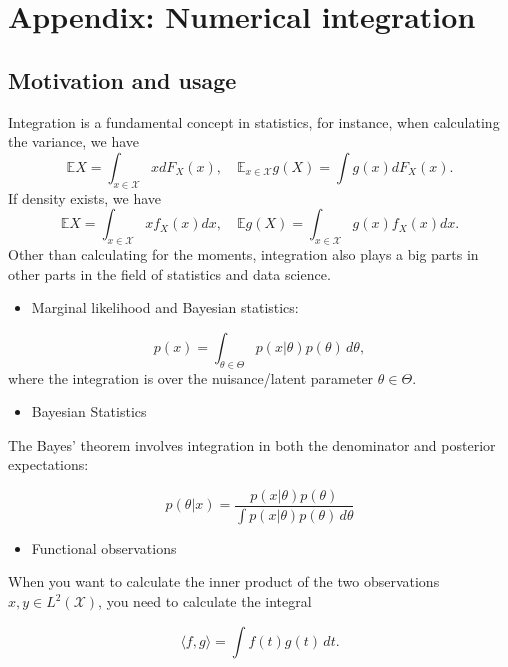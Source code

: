 \documentclass[
  letterpaper,
  DIV=11,
  numbers=noendperiod]{scrreprt}
\providecommand{\tightlist}{%
  \setlength{\itemsep}{0pt}\setlength{\parskip}{0pt}}
\begin{document}
\chapter{Appendix: Numerical
integration}\label{appendix-numerical-integration}

\newcommand{\E}{\mathbb E}
\newcommand{\X}{\mathcal X}

\section{Motivation and usage}\label{motivation-and-usage}

Integration is a fundamental concept in statistics, for instance, when
calculating the variance, we have \[
  \mathbb EX = \int_{x\in\mathcal X} x dF_X(x),\quad \mathbb E_{x\in\mathcal X} g(X) = \int g(x) dF_X(x).
\] If density exists, we have \[
\mathbb EX = \int_{x\in\mathcal X} x f_X(x) dx,\quad \mathbb Eg(X) = \int_{x\in\mathcal X} g(x) f_X(x) dx.
\] Other than calculating for the moments, integration also plays a big
parts in other parts in the field of statistics and data science.

\begin{itemize}
\tightlist
\item
  Marginal likelihood and Bayesian statistics:
\end{itemize}

\[
  p(x) = \int_{\theta\in\Theta}     p(x|\theta)p(\theta)\,d\theta,
\] where the integration is over the nuisance/latent parameter
\(\theta\in\Theta\).

\begin{itemize}
\tightlist
\item
  Bayesian Statistics
\end{itemize}

The Bayes' theorem involves integration in both the denominator and
posterior expectations:

\[
p(\theta|x) = \frac{p(x|\theta)p(\theta)}{\int p(x|\theta)p(\theta)\,d\theta}
\]

\begin{itemize}
\tightlist
\item
  Functional observations
\end{itemize}

When you want to calculate the inner product of the two observations
\(x,y\in L^2(\mathcal X)\), you need to calculate the integral

\[
\langle f,g \rangle = \int f(t)g(t)\,dt.
\]
\end{document}
